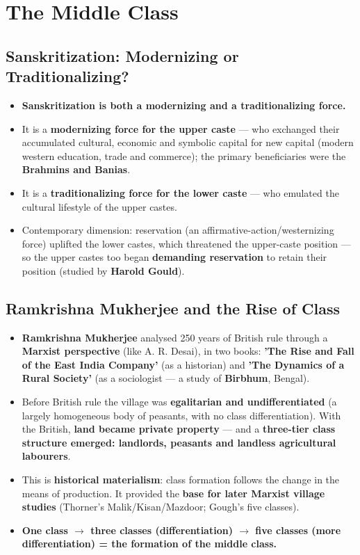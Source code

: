 \chapter{The Middle Class}

\section{Sanskritization: Modernizing or Traditionalizing?}

\begin{KeyConcept}
\begin{itemize}
\item \textbf{Sanskritization is both a modernizing and a traditionalizing force.}
\item It is a \textbf{modernizing force for the upper caste} --- who exchanged their accumulated cultural, economic and symbolic capital for new capital (modern western education, trade and commerce); the primary beneficiaries were the \textbf{Brahmins and Banias}.
\item It is a \textbf{traditionalizing force for the lower caste} --- who emulated the cultural lifestyle of the upper castes.
\item Contemporary dimension: reservation (an affirmative-action/westernizing force) uplifted the lower castes, which threatened the upper-caste position --- so the upper castes too began \textbf{demanding reservation} to retain their position (studied by \textbf{Harold Gould}).
\end{itemize}
\end{KeyConcept}

\section{Ramkrishna Mukherjee and the Rise of Class}

\begin{KeyConcept}
\begin{itemize}
\item \textbf{Ramkrishna Mukherjee} analysed 250 years of British rule through a \textbf{Marxist perspective} (like A. R. Desai), in two books: \textbf{'The Rise and Fall of the East India Company'} (as a historian) and \textbf{'The Dynamics of a Rural Society'} (as a sociologist --- a study of \textbf{Birbhum}, Bengal).
\item Before British rule the village was \textbf{egalitarian and undifferentiated} (a largely homogeneous body of peasants, with no class differentiation). With the British, \textbf{land became private property} --- and a \textbf{three-tier class structure emerged: landlords, peasants and landless agricultural labourers}.
\item This is \textbf{historical materialism}: class formation follows the change in the means of production. It provided the \textbf{base for later Marxist village studies} (Thorner's Malik/Kisan/Mazdoor; Gough's five classes).
\item \textbf{One class $\rightarrow$ three classes (differentiation) $\rightarrow$ five classes (more differentiation) = the formation of the middle class.}
\end{itemize}
\end{KeyConcept}

